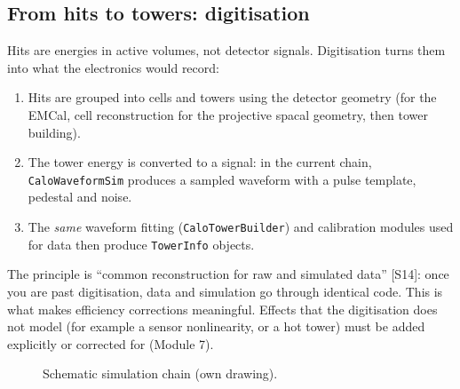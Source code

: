 \documentclass[11pt,letterpaper]{article}
\begin{document}
\subsection{From hits to towers: digitisation}
Hits are energies in active volumes, not detector signals. Digitisation turns them into what the electronics would record:
\begin{enumerate}
\item Hits are grouped into cells and towers using the detector geometry (for the EMCal, cell reconstruction for the projective spacal geometry, then tower building).
\item The tower energy is converted to a signal: in the current chain, \texttt{CaloWaveformSim} produces a sampled waveform with a pulse template, pedestal and noise.
\item The \emph{same} waveform fitting (\texttt{CaloTowerBuilder}) and calibration modules used for data then produce \texttt{TowerInfo} objects.
\end{enumerate}
The principle is ``common reconstruction for raw and simulated data'' [S14]: once you are past digitisation, data and simulation go through identical code.
This is what makes efficiency corrections meaningful. Effects that the digitisation does not model (for example a sensor nonlinearity, or a hot tower) must be added explicitly or corrected for (Module 7).

\begin{figure}[h]\centering
{}
\caption{Schematic simulation chain (own drawing).}\label{fig:simchain}
\end{figure}
\end{document}
